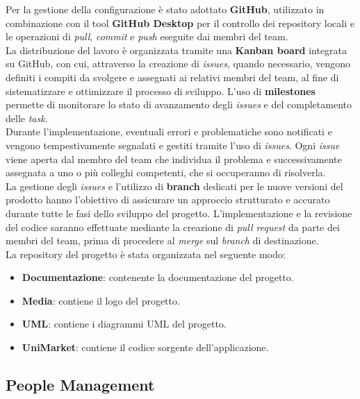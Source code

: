 \documentclass[a4paper,12pt]{article}
\begin{document}
Per la gestione della configurazione è stato adottato \textbf{GitHub}, utilizzato in combinazione con il tool \textbf{GitHub Desktop} per il controllo dei repository locali e le operazioni di \emph{pull}, \emph{commit} e \emph{push} eseguite dai membri del team. \\ 
La distribuzione del lavoro è organizzata tramite una \textbf{Kanban board} integrata su GitHub, con cui, attraverso la creazione di \emph{issues}, quando necessario, vengono definiti i compiti da svolgere e assegnati ai relativi membri del team, al fine di sistematizzare e ottimizzare il processo di sviluppo.  
L’uso di \textbf{milestones} permette di monitorare lo stato di avanzamento degli \emph{issues} e del completamento delle \emph{task}.  \\
Durante l'implementazione, eventuali errori e problematiche sono notificati e vengono tempestivamente segnalati e gestiti tramite l'uso di \emph{issues}. Ogni \emph{issue} viene aperta dal membro del team che individua il problema e successivamente assegnata a uno o più colleghi competenti, che si occuperanno di risolverla.  \\
La gestione degli \emph{issues} e l’utilizzo di \textbf{branch} dedicati per le nuove versioni del prodotto hanno l’obiettivo di assicurare un approccio strutturato e accurato durante tutte le fasi dello sviluppo del progetto.  
L’implementazione e la revisione del codice saranno effettuate mediante la creazione di \emph{pull request} da parte dei membri del team, prima di procedere al \emph{merge} sul \emph{branch} di destinazione.\\
La repository del progetto è stata organizzata nel seguente modo:
\begin{itemize}
    \item \textbf{Documentazione}: contenente la documentazione del progetto. 
    \item \textbf{Media}: contiene il logo del progetto.
    \item \textbf{UML}: contiene i diagrammi UML del progetto.
    \item \textbf{UniMarket}: contiene il codice sorgente dell'applicazione.
\end{itemize}

\subsection{People Management}
\end{document}
